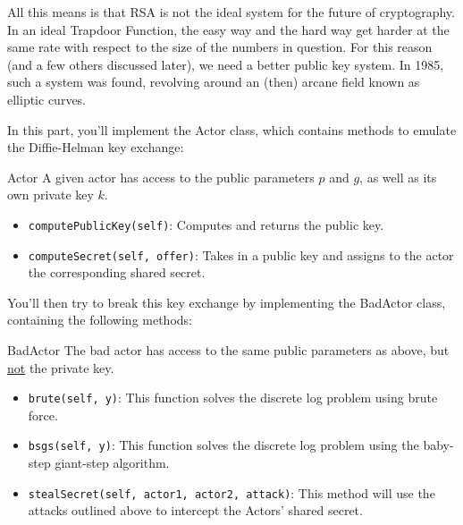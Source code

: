 \documentclass{article}
\begin{document}
    \vspace{2mm}
    All this means is that RSA is not the ideal system for the future of cryptography. In an ideal Trapdoor Function, the easy way and the hard way get harder at the same rate with respect to the size of the numbers in question. For this reason (and a few others discussed later), we need a better public key system. In 1985, such a system was found, revolving around an (then) arcane field known as elliptic curves.

    \begin{tcolorbox}[enhanced,interior style={top color=Plum!20,bottom color=Plum!40}]
        In this part, you'll implement the Actor class, which contains methods to emulate the Diffie-Helman key exchange:
    
        \begin{mybox}[
            colframe=Cerulean!50!black,
            colback=Cerulean!30,
            colbacktitle=Cerulean!,
            coltitle=Cerulean!30!black
            ]{Actor}
            A given actor has access to the public parameters $p$ and $g$, as well as its own private key $k$.
            \begin{itemize}
                \item \lstinline{computePublicKey(self)}: Computes and returns the public key.
                \item \lstinline{computeSecret(self, offer)}: Takes in a public key and assigns to the actor the corresponding shared secret.
            \end{itemize}
    
        \end{mybox}
    
        You'll then try to break this key exchange by implementing the BadActor class, containing the following methods:
    
        \begin{mybox}[
            colframe=purple!50!black,
            colback=purple!40,
            colbacktitle=purple!50!white,
            coltitle=purple!30!black,
            ]{BadActor}
            The bad actor has access to the same public parameters as above, but \underline{not} the private key.
            \begin{itemize}
                \item \lstinline{brute(self, y)}: This function solves the discrete log problem using brute force.
                \item \lstinline{bsgs(self, y)}: This function solves the discrete log problem using the baby-step giant-step algorithm.
                \item \lstinline{stealSecret(self, actor1, actor2, attack)}: This method will use the attacks outlined above to intercept the Actors' shared secret.
            \end{itemize}
        \end{mybox}
    

\end{tcolorbox}
\end{document}

